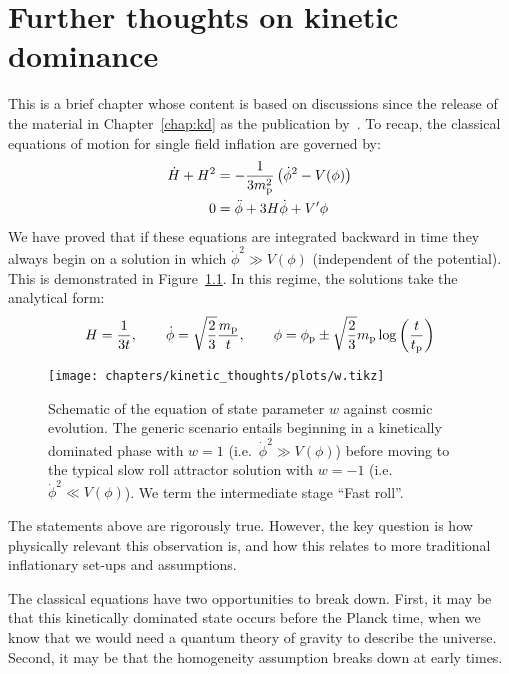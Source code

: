 \chapter{Further thoughts on kinetic dominance}
\label{chap:kt}

This is a brief chapter whose content is based on discussions since the release of the material in Chapter~\ref{chap:kd} as the publication by~\cite{Handley+2014}.
To recap, the classical equations of motion for single field inflation are
governed by:
%
\begin{align}
  \dot{H} + H^2 
  &= - \frac{1}{3m_{\mathrm{p}}^2}\left( \dot{\phi}^2 - V(\phi)\right)
  \label{eqn:kt:raychaudhuri}
  \\
  0 &= \ddot{\phi} + 3H\dot\phi + V^\prime{\phi}
  \label{eqn:kt:kleingordon}
\end{align}
%
We have proved that if these equations are integrated backward in time
they always begin on a solution in which $\dot\phi^2\gg V(\phi)$
(independent of the potential). This is demonstrated in
Figure~\ref{fig:kt:w}. In this regime, the solutions take the analytical
form:
\begin{equation}
  H = \frac{1}{3t},\qquad \dot{\phi} 
  = \sqrt{\frac 2 3}\frac{m_{\mathrm{p}}}{t}, \qquad \phi 
  = \phi_{\mathrm{p}} \pm \sqrt{\frac 2 3}m_{\mathrm{p}} \log\left( \frac t {t_{\mathrm{p}}} \right)
\end{equation}
\begin{figure}[tp]
  \texttt{[image: chapters/kinetic\_thoughts/plots/w.tikz]}
  \caption{%
    Schematic of the equation of state parameter $w$ against cosmic
    evolution. The generic scenario entails beginning in a kinetically
    dominated phase with $w=1$ (i.e.\ $\dot{\phi}^2\gg V(\phi)$)
    before moving to the typical slow roll attractor solution with
    $w=-1$ (i.e.\ $\dot{\phi}^2 \ll V(\phi)$). We term the
    intermediate stage ``Fast roll''.\label{fig:kt:w}
  }
\end{figure}

The statements above are rigorously true. However, the key question is how physically relevant this observation is, and how this relates to more traditional inflationary set-ups and assumptions.

The classical equations have two opportunities to break down. First, it may be that this kinetically dominated state occurs before the Planck time, when we know that we would need a quantum theory of gravity to describe the universe. Second, it may be that the homogeneity assumption breaks down at early times.

